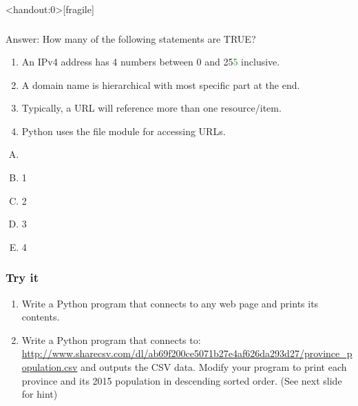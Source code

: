 \documentclass[xcolor=svgnames]{beamer}
\newcommand{\green}[1]{\textcolor{ForestGreen}{#1}}
\newcommand{\tans}[2]{\textbf<#1>{\textit<#1>{{\color<#1>{iyellow}{#2}}}}}
\newcommand{\ft}[1]{\frametitle{#1}}
\begin{document}
\begin{frame}<handout:0>[fragile]\ft{}
  \begin{block}{Answer:}
How many of the following statements are TRUE?
\begin{enumerate}
\item {	{An IPv4 address has 4 numbers between 0 and 25}\green{5} {inclusive.}}
\item {	{A domain name is hierarchical with most specific part at the end.}}
\item {	{Typically, a URL will reference more than one resource/item.}}
\item {	{Python uses the file module for accessing URLs.}} 
\end{enumerate}
\begin{multicols}{5}
\begin{enumerate}[A)]
\item \tans{4}{0} 
\item 1
\item 2
\item 3
\item 4
\end{enumerate}
\end{multicols}
  \end{block} 
\end{frame}


\begin{frame}\ft{Try it}
\begin{example}
\begin{enumerate}
\item  Write a Python program that connects to any web page and prints its contents.
\item Write a Python program that connects to: 
\url{http://www.sharecsv.com/dl/ab69f200ce5071b27e4af626da293d27/province_population.csv}
and outputs the CSV data.
Modify your program to print each province and its 2015 population in descending sorted order. (See next slide for hint)
\end{enumerate}
\end{example}
\end{frame}
\end{document}
